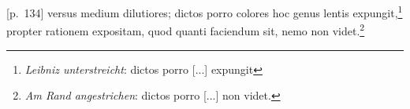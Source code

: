  [p.~134] versus medium dilutiores; dictos porro colores\protect{} hoc genus lentis\protect{} expungit,\footnote{\textit{Leibniz unterstreicht}: dictos porro [...] expungit} propter rationem expositam, quod  quanti faciendum sit, nemo non videt.\footnote{\textit{Am Rand angestrichen}: dictos porro [...] non videt.}